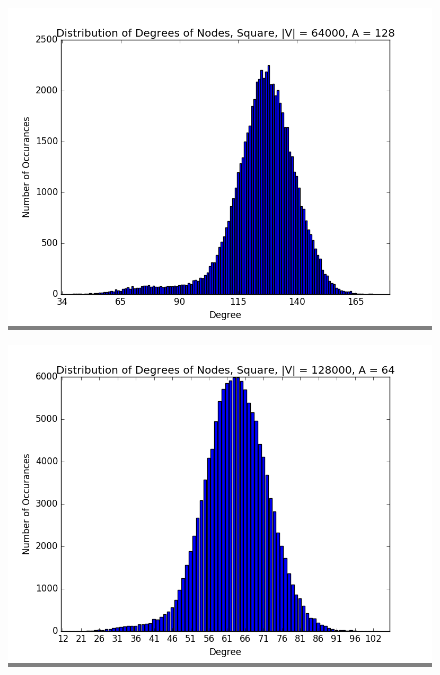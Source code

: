 \documentclass{article}
\begin{document}
\begin{figure}
\begin{minipage}{0.3\textwidth}
    \colorbox{gray}{\includegraphics[width=\linewidth]{./graphs/hist_deg_square_4.png}}
    \end{minipage}
    \hspace{\fill}
    \begin{minipage}{0.3\textwidth}
    \colorbox{gray}{\includegraphics[width=\linewidth]{./graphs/hist_deg_square_5.png}}
    \end{minipage}
    \vskip 0.1in
    \begin{minipage}{0.3\textwidth}

\end{minipage}
\end{figure}
\end{document}
